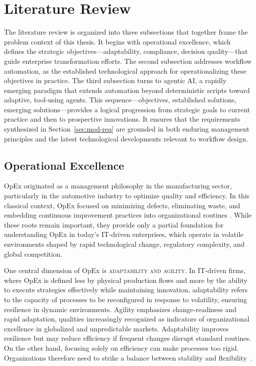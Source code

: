 \section{Literature Review}\label{sec:lit-rev}
The literature review is organized into three subsections that together frame the problem context of this thesis. It begins with operational excellence, which defines the strategic objectives—adaptability, compliance, decision quality—that guide enterprise transformation efforts. The second subsection addresses workflow automation, as the established technological approach for operationalizing these objectives in practice. The third subsection turns to agentic AI, a rapidly emerging paradigm that extends automation beyond deterministic scripts toward adaptive, tool-using agents. This sequence—objectives, established solutions, emerging solutions—provides a logical progression from strategic goals to current practice and then to prospective innovations. It ensures that the requirements synthesized in Section~\ref{sec:mod-req} are grounded in both enduring management principles and the latest technological developments relevant to workflow design.

\subsection{Operational Excellence}\label{subsec:op-ex}
OpEx originated as a management philosophy in the manufacturing sector, particularly in the automotive industry to optimize quality and efficiency. In this classical context, OpEx focused on minimizing defects, eliminating waste, and embedding continuous improvement practices into organizational routines \parencite{womackLean1997}. While these roots remain important, they provide only a partial foundation for understanding OpEx in today's IT-driven enterprises, which operate in volatile environments shaped by rapid technological change, regulatory complexity, and global competition.

One central dimension of OpEx is \textsc{adaptability and agility}. In IT-driven firms, where OpEx is defined less by physical production flows and more by the ability to execute strategies effectively while maintaining innovation, adaptability refers to the capacity of processes to be reconfigured in response to volatility, ensuring resilience in dynamic environments. Agility emphasizes change-readiness and rapid adaptation, qualities increasingly recognized as indicators of organizational excellence in globalized and unpredictable markets. Adaptability improves resilience but may reduce efficiency if frequent changes disrupt standard routines. On the other hand, focusing solely on efficiency can make processes too rigid. Organizations therefore need to strike a balance between stability and flexibility~\parencite[cf.][p. 1599]{carvalhoOperational2023}.

